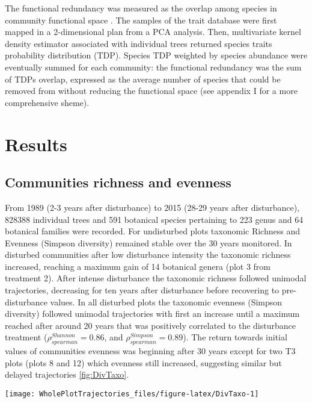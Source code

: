 \documentclass[fleqn,10pt]{ArtEcoFoG} %
\theoremstyle{definition}
\theoremstyle{definition}
\theoremstyle{definition}
\theoremstyle{remark}
\begin{document}
The functional redundancy was measured as the overlap among species in
community functional space \citep{Carmona2016}. The samples of the trait
database were first mapped in a 2-dimensional plan from a PCA analysis.
Then, multivariate kernel density estimator associated with individual
trees returned species traits probability distribution (TDP). Species
TDP weighted by species abundance were eventually summed for each
community: the functional redundancy was the sum of TDPs overlap,
expressed as the average number of species that could be removed from
without reducing the functional space (see appendix I for a more
comprehensive sheme).

\section{Results}\label{results}

\subsection{Communities richness and
evenness}\label{communities-richness-and-evenness}

From 1989 (2-3 years after disturbance) to 2015 (28-29 years after
disturbance), 828388 individual trees and 591 botanical species
pertaining to 223 genus and 64 botanical families were recorded. For
undisturbed plots taxonomic Richness and Evenness (Simpson diversity)
remained stable over the 30 years monitored. In disturbed communities
after low disturbance intensity the taxonomic richness increased,
reaching a maximum gain of 14 botanical genera (plot 3 from treatment
2). After intense disturbance the taxonomic richness followed unimodal
trajectories, decreasing for ten years after disturbance before
recovering to pre-disturbance values. In all disturbed plots the
taxonomic evenness (Simpson diversity) followed unimodal trajectories
with first an increase until a maximum reached after around 20 years
that was positively correlated to the disturbance treatment
(\(\rho_{spearman}^{Shannon}=0.86\), and
\(\rho_{spearman}^{Simpson}=0.89\)). The return towards initial values
of communities evenness was beginning after 30 years except for two T3
plots (plots 8 and 12) which evenness still increased, suggesting
similar but delayed trajectories \ref{fig:DivTaxo}.

\begin{figure*}

{\centering \texttt{[image: WholePlotTrajectories\_files/figure-latex/DivTaxo-1]} 

}

\caption{Trajectories of the difference to the 1989 inventories (5 years after disturbance) over 30 years after disturbance of plots communities \textbf{(a)} Richness, \textbf{(b)} Shannon and \textbf{(c)} Simpson diversities. Trajectories correspond to the median (solid line) and 0.025 and 0.975 percentile (gray envelope) observed after 50 iteration of the taxonomic uncertainty propagation. Initial treatments are represented by solid lines colors with green for control, blue for T1,orange for T2 and red for T3.}\label{fig:DivTaxo}
\end{figure*}
\end{document}
